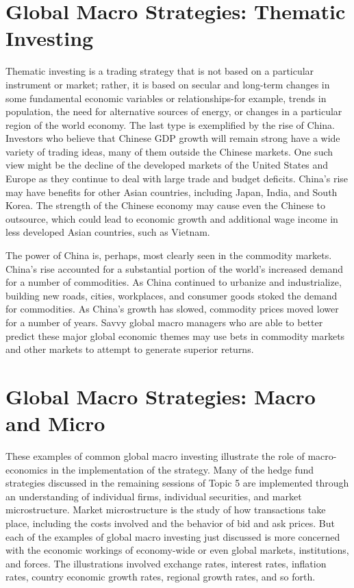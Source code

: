 \documentclass[11pt]{article}
\begin{document}
\section*{Global Macro Strategies: Thematic Investing}
Thematic investing is a trading strategy that is not based on a particular instrument or market; rather, it is based on secular and long-term changes in some fundamental economic variables or relationships-for example, trends in population, the need for alternative sources of energy, or changes in a particular region of the world economy. The last type is exemplified by the rise of China. Investors who believe that Chinese GDP growth will remain strong have a wide variety of trading ideas, many of them outside the Chinese markets. One such view might be the decline of the developed markets of the United States and Europe as they continue to deal with large trade and budget deficits. China's rise may have benefits for other Asian countries, including Japan, India, and South Korea. The strength of the Chinese economy may cause even the Chinese to outsource, which could lead to economic growth and additional wage income in less developed Asian countries, such as Vietnam.

The power of China is, perhaps, most clearly seen in the commodity markets. China's rise accounted for a substantial portion of the world's increased demand for a number of commodities. As China continued to urbanize and industrialize, building new roads, cities, workplaces, and consumer goods stoked the demand for commodities. As China's growth has slowed, commodity prices moved lower for a number of years. Savvy global macro managers who are able to better predict these major global economic themes may use bets in commodity markets and other markets to attempt to generate superior returns.

\section*{Global Macro Strategies: Macro and Micro}
These examples of common global macro investing illustrate the role of macro-economics in the implementation of the strategy. Many of the hedge fund strategies discussed in the remaining sessions of Topic 5 are implemented through an understanding of individual firms, individual securities, and market microstructure. Market microstructure is the study of how transactions take place, including the costs involved and the behavior of bid and ask prices. But each of the examples of global macro investing just discussed is more concerned with the economic workings of economy-wide or even global markets, institutions, and forces. The illustrations involved exchange rates, interest rates, inflation rates, country economic growth rates, regional growth rates, and so forth.
\end{document}
